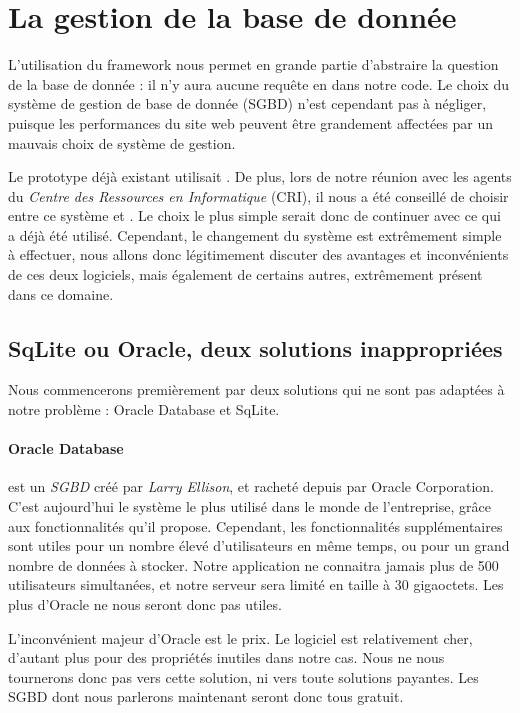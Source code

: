 \section{La gestion de la base de donnée}

L'utilisation du framework \symfony nous permet en grande partie d'abstraire la question de la base de donnée : il n'y aura aucune requête en \sql dans notre code. 
Le choix du système de gestion de base de donnée (SGBD) n'est cependant pas  à négliger, puisque les performances du site web peuvent être grandement affectées par un mauvais choix de système de gestion. 

Le prototype déjà existant utilisait \mysql. 
De plus, lors de notre réunion avec les agents du \textit{Centre des Ressources en Informatique} (CRI), il nous a été conseillé de choisir entre ce système et \psql. 
Le choix le plus simple serait donc de continuer avec ce qui a déjà été utilisé. 
Cependant, le changement du système est extrêmement simple à effectuer, nous allons donc légitimement  discuter des avantages et inconvénients de ces deux logiciels, mais également de certains autres, extrêmement présent dans ce domaine. 

\subsection{SqLite ou Oracle, deux solutions inappropriées}

Nous commencerons premièrement par deux solutions qui ne sont pas adaptées à notre problème : Oracle Database et SqLite. 

\paragraph*{Oracle Database } est un \textit{SGBD} créé par \textit{Larry Ellison}, et racheté depuis par Oracle Corporation. C'est aujourd'hui le système le plus utilisé dans le monde de l'entreprise, grâce aux fonctionnalités qu'il propose. 
Cependant, les fonctionnalités supplémentaires sont utiles pour un nombre élevé d'utilisateurs en même temps, ou pour un grand nombre de données à stocker. Notre application ne connaitra jamais plus de 500 utilisateurs simultanées, et notre serveur sera limité en taille à 30 gigaoctets. Les plus d'Oracle ne nous seront donc pas utiles. 

L'inconvénient majeur d'Oracle est le prix. Le logiciel est relativement cher, d'autant plus pour des propriétés inutiles dans notre cas.
Nous ne nous tournerons donc pas vers cette solution, ni vers toute solutions payantes. Les SGBD dont nous parlerons maintenant seront donc tous gratuit. 


